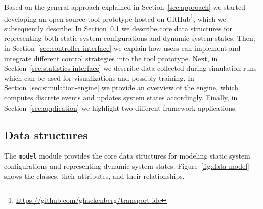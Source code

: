 \documentclass[a4paper,twoside]{article}
\begin{document}
	Based on the general approach explained in Section~\ref{sec:approach} we started developing an open source tool prototype hosted on GitHub\footnote{\url{https://github.com/ghackenberg/transport-ide}}, which we subsequently describe:
	In Section~\ref{sec:data-model} we describe core data structures for representing both static system configurations and dynamic system states.
	Then, in Section~\ref{sec:controller-interface} we explain how users can implement and integrate different control strategies into the tool prototype.
	Next, in Section~\ref{sec:statistics-interface} we describe data collected during simulation runs which can be used for visualizations and possibly training.
	In Section~\ref{sec:simulation-engine} we provide an overview of the engine, which computes discrete events and updates system states accordingly.
	Finally, in Section~\ref{sec:application} we highlight two different framework applications.
	
	
	
	
	\subsection{Data structures}
	\label{sec:data-model}
	
	The \texttt{model} module provides the core data structures for modeling static system configurations and representing dynamic system states.
	Figure~\ref{fig:data-model} shows the classes, their attributes, and their relationships.
	
\end{document}
